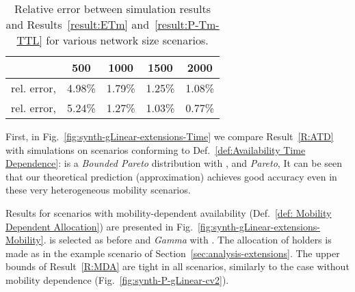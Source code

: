 \documentclass[journal]{IEEEtran}
\begin{document}
\begin{table}[!h]
\centering
\caption{Relative error between simulation results and Results~\ref{result:ETm} and~\ref{result:P-Tm-TTL} for various network size scenarios.}
\begin{tabular}{|l|cccc|}
\hline
		& 500 	&1000 	&1500	&2000\\
\hline
rel. error,  &  4.98\% & 1.79\% & 1.25\% & 1.08\% \\
rel. error,  &  5.24\% & 1.27\% & 1.03\% & 0.77\%\\
\hline
 \end{tabular}
\label{Table:relative-error-vsNetworkSize}
\end{table}


 First, in Fig.~\ref{fig:synth-gLinear-extensions-Time} we compare Result~\ref{R:ATD} with simulations on scenarios conforming to Def.~\ref{def:Availability Time Dependence}:  is a \textit{Bounded Pareto} distribution with , and  \textit{Pareto},  It can be seen that our theoretical prediction (approximation) achieves good accuracy even in these very heterogeneous mobility scenarios.

Results for scenarios with mobility-dependent availability (Def.~\ref{def: Mobility Dependent Allocation}) are presented in Fig.~\ref{fig:synth-gLinear-extensions-Mobility}.  is selected as before and  \textit{Gamma} with . The allocation of holders is made as in the example scenario of Section~\ref{sec:analysis-extensions}. The upper bounds of Result~\ref{R:MDA} are tight in all scenarios, similarly to the case without mobility dependence (Fig.~\ref{fig:synth-P-gLinear-cv2}).
\end{document}
